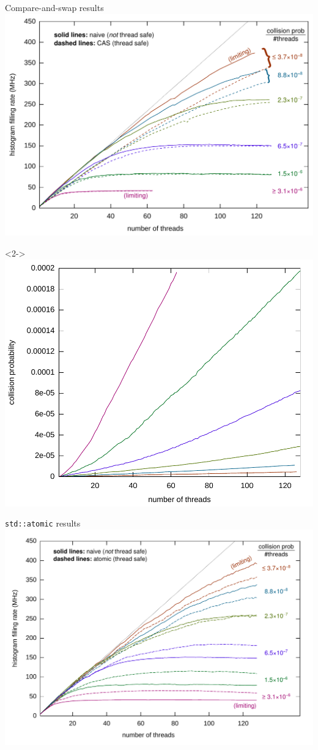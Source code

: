 \documentclass{beamer}
\begin{document}
\begin{frame}{Compare-and-swap results}
\vspace{0.5 cm}
\includegraphics[width=\linewidth]{overlay.pdf}

\vspace{-4.3 cm}
\begin{uncoverenv}<2->
\hfill \includegraphics[width=0.55\linewidth]{prob.pdf}\hspace{-1 cm}
\end{uncoverenv}
\end{frame}

\begin{frame}{{\tt std::atomic} results}
\vspace{0.5 cm}
\includegraphics[width=\linewidth]{overlay2.pdf}
\end{frame}
\end{document}
